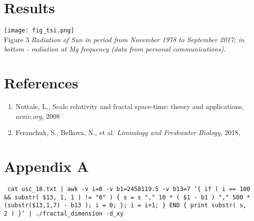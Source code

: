 \documentclass[a4paper]{article}
\begin{document}
\section*{Results}

\texttt{[image: fig\_tsi.png]}\\
Figure 3 \textit{Radiation of Sun in period from November 1978 to September 2017; in bottom - radiation at Mg frequency (data from personal communications). }

\section*{References}

\begin{enumerate}

\item Nottale, L., Scale relativity and fractal space-time: theory and applications, \textit{arxiv.org}, 2008

\item Feranchuk, S., Belkova, N., et al. \textit{Limnology and Freshwater Biology}, 2018,

\end{enumerate}

\section*{Appendix A}


\texttt{\small{ cat usc\_18.txt | awk -v i=0 -v b1=2458119.5 -v b13=7 '\{ if ( i == 100 \&\& substr( \$13, 1, 1 ) != "0" ) \{ s = s "," 10 * ( \$1 - b1 ) "," 500 * (substr(\$13,1,7) - b13 ); i = 0; \}; i = i+1; \} END \{ print substr( s, 2 ) \}' | ./fractal\_dimension -d\_xy }}

\end{document}

